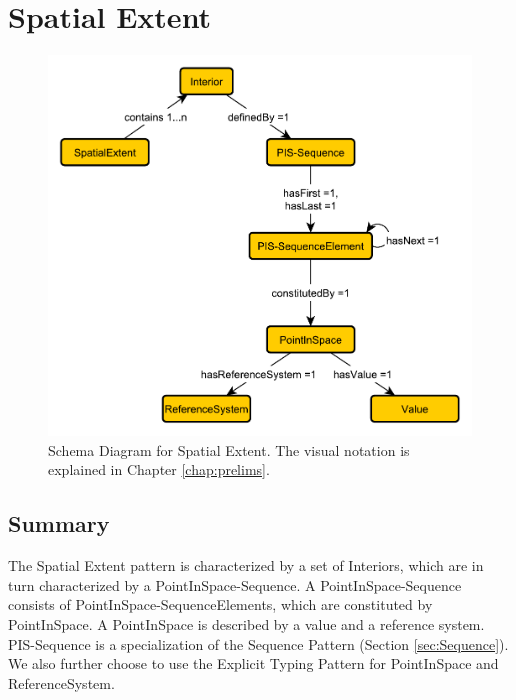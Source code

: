 \section{Spatial Extent}
\label{sec:Spatial}
\begin{figure}[h!]
\begin{center}
\includegraphics[width=.8\textwidth]{figures/spatial}
\end{center}
\caption{Schema Diagram for Spatial Extent. The visual notation is explained in Chapter \ref{chap:prelims}.}
\label{fig:Spatial}
\end{figure}
\subsection{Summary}
\label{sum:Spatial}
The Spatial Extent pattern is characterized by a set of \textsf{Interiors}, which are in turn characterized by a \textsf{PointInSpace-Sequence}. A \textsf{PointInSpace-Sequence} consists of \textsf{PointInSpace-SequenceElements}, which are constituted by \textsf{PointInSpace}. A \textsf{PointInSpace} is described by a value and a reference system. \textsf{PIS-Sequence} is a specialization of the \textsf{Sequence} Pattern (Section \ref{sec:Sequence}). We also further choose to use the Explicit Typing Pattern for \textsf{PointInSpace} and \textsf{ReferenceSystem}.

